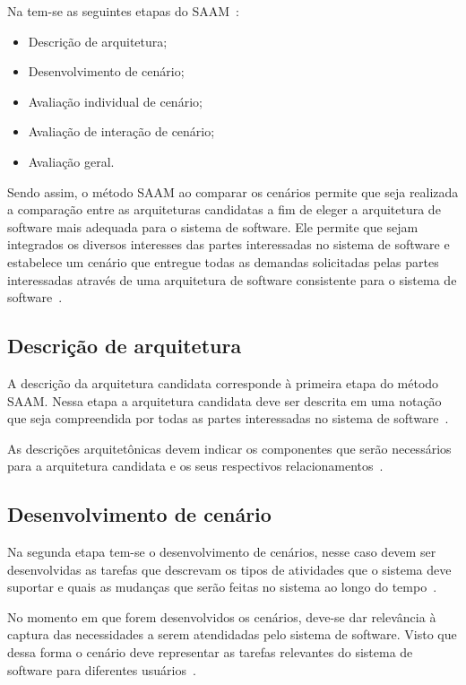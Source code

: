 Na  tem-se as seguintes etapas do SAAM~\cite{scenario_methods}:
\begin{itemize}
    \item Descrição de arquitetura;
    \item Desenvolvimento de cenário;
    \item Avaliação individual de cenário;
    \item Avaliação de interação de cenário;
    \item Avaliação geral.
\end{itemize}

Sendo assim, o método SAAM ao comparar os cenários permite que seja realizada a comparação entre as arquiteturas candidatas a fim de eleger a arquitetura de software mais adequada para o sistema de software. Ele permite que sejam integrados os diversos interesses  das partes interessadas no sistema de software e estabelece um cenário que entregue todas as demandas solicitadas pelas partes interessadas através de uma arquitetura de software consistente para o sistema de software~\cite{survey_methods}.

\subsection{Descrição de arquitetura}

A descrição da arquitetura candidata corresponde à primeira etapa do método SAAM. Nessa etapa a arquitetura candidata deve ser descrita em uma notação que seja compreendida por todas as partes interessadas no sistema de software~\cite{scenario_methods}.

As descrições arquitetônicas devem indicar os componentes que serão necessários para a arquitetura candidata e os seus respectivos relacionamentos~\cite{scenario_methods}.

\subsection{Desenvolvimento de cenário}

Na segunda etapa tem-se o desenvolvimento de cenários, nesse caso devem ser desenvolvidas as tarefas que descrevam os tipos de atividades que o sistema deve suportar e quais as mudanças que serão feitas no sistema ao longo do tempo~\cite{scenario_methods}. 

No momento em que forem desenvolvidos os cenários, deve-se dar relevância à captura das necessidades a serem atendidadas pelo sistema de software. Visto que dessa forma o cenário deve representar as tarefas relevantes do sistema de software para diferentes usuários~\cite{scenario_methods}.

